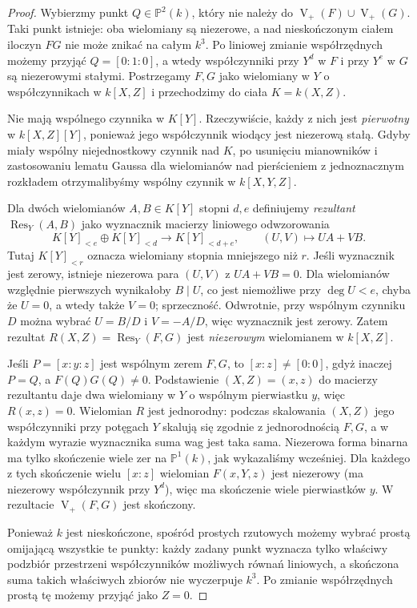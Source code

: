 \documentclass[11pt,a4paper,openany]{report}
\numberwithin{equation}{section}
\theoremstyle{plain}
\theoremstyle{definition}
\theoremstyle{remark}
\newcommand{\PP}{\mathbb P}
\newcommand{\V}{\operatorname V}
\begin{document}
\begin{proof}
Wybierzmy punkt $Q\in\PP^2(k)$, który nie należy do
$\V_+(F)\cup\V_+(G)$. Taki punkt istnieje:
oba wielomiany są niezerowe, a nad nieskończonym ciałem
iloczyn $FG$ nie może znikać na całym $k^3$.
Po liniowej zmianie współrzędnych możemy przyjąć
$Q=[0:1:0]$, a wtedy współczynniki przy $Y^d$ w $F$
i przy $Y^e$ w $G$ są niezerowymi stałymi.
Postrzegamy $F,G$ jako wielomiany w $Y$ o współczynnikach
w $k[X,Z]$ i przechodzimy do ciała $K=k(X,Z)$.

Nie mają wspólnego czynnika w $K[Y]$. Rzeczywiście,
każdy z nich jest \emph{pierwotny} w $k[X,Z][Y]$,
ponieważ jego współczynnik wiodący jest niezerową stałą.
Gdyby miały wspólny niejednostkowy czynnik nad $K$,
po usunięciu mianowników i zastosowaniu lematu Gaussa
dla wielomianów nad pierścieniem z jednoznacznym rozkładem
otrzymalibyśmy wspólny czynnik w $k[X,Y,Z]$.

Dla dwóch wielomianów $A,B\in K[Y]$ stopni $d,e$
definiujemy \emph{rezultant} $\operatorname{Res}_Y(A,B)$
jako wyznacznik macierzy liniowego odwzorowania
\[
 K[Y]_{<e}\oplus K[Y]_{<d}\longrightarrow K[Y]_{<d+e},
 \qquad (U,V)\longmapsto UA+VB.
\]
Tutaj $K[Y]_{<r}$ oznacza wielomiany stopnia mniejszego niż $r$.
Jeśli wyznacznik jest zerowy, istnieje niezerowa para
$(U,V)$ z $UA+VB=0$. Dla wielomianów względnie pierwszych
wynikałoby $B\mid U$, co jest niemożliwe przy $\deg U<e$,
chyba że $U=0$, a wtedy także $V=0$; sprzeczność.
Odwrotnie, przy wspólnym czynniku $D$ można wybrać
$U=B/D$ i $V=-A/D$, więc wyznacznik jest zerowy.
Zatem rezultat $R(X,Z)=\operatorname{Res}_Y(F,G)$
jest \emph{niezerowym} wielomianem w $k[X,Z]$.

Jeśli $P=[x:y:z]$ jest wspólnym zerem $F,G$, to
$[x:z]\ne[0:0]$, gdyż inaczej $P=Q$, a $F(Q)G(Q)\ne0$.
Podstawienie $(X,Z)=(x,z)$ do macierzy rezultantu
daje dwa wielomiany w $Y$ o wspólnym pierwiastku $y$,
więc $R(x,z)=0$.
Wielomian $R$ jest jednorodny: podczas skalowania
$(X,Z)$ jego współczynniki przy potęgach $Y$ skalują się
zgodnie z jednorodnością $F,G$, a w każdym wyrazie
wyznacznika suma wag jest taka sama.
Niezerowa forma binarna ma tylko skończenie wiele zer na
$\PP^1(k)$, jak wykazaliśmy wcześniej. Dla każdego z tych
skończenie wielu $[x:z]$ wielomian $F(x,Y,z)$ jest
niezerowy (ma niezerowy współczynnik przy $Y^d$),
więc ma skończenie wiele pierwiastków $y$.
W rezultacie $\V_+(F,G)$ jest skończony.

Ponieważ $k$ jest nieskończone, spośród prostych rzutowych
możemy wybrać prostą omijającą wszystkie te punkty:
każdy zadany punkt wyznacza tylko właściwy podzbiór
przestrzeni współczynników możliwych równań liniowych,
a skończona suma takich właściwych zbiorów nie wyczerpuje
$k^3$. Po zmianie współrzędnych prostą tę możemy przyjąć
jako $Z=0$.
\end{proof}
\end{document}
